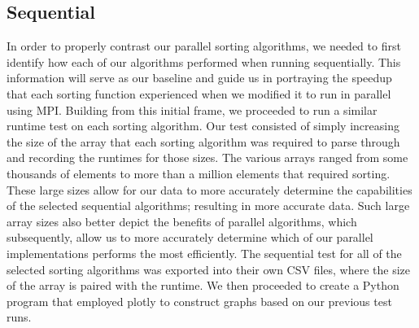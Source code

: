 \documentclass[11pt,twocolumn]{article}
\begin{document}
\subsection{Sequential}

In order to properly contrast our parallel sorting algorithms, we needed to first identify how each of our algorithms performed when running sequentially. This information will serve as our baseline and guide us in portraying the speedup that each sorting function experienced when we modified it to run in parallel using MPI. Building from this initial frame, we proceeded to run a similar runtime test on each sorting algorithm. Our test consisted of simply increasing the size of the array that each sorting algorithm was required to parse through and recording the runtimes for those sizes. The various arrays ranged from some thousands of elements to more than a million elements that required sorting. These large sizes allow for our data to more accurately determine the capabilities of the selected sequential algorithms; resulting in more accurate data. Such large array sizes also better depict the benefits of parallel algorithms, which subsequently, allow us to more accurately determine which of our parallel implementations performs the most efficiently. The sequential test for all of the selected sorting algorithms was exported into their own CSV files, where the size of the array is paired with the runtime. We then proceeded to create a Python program that employed plotly to construct graphs based on our previous test runs. 
\end{document}
